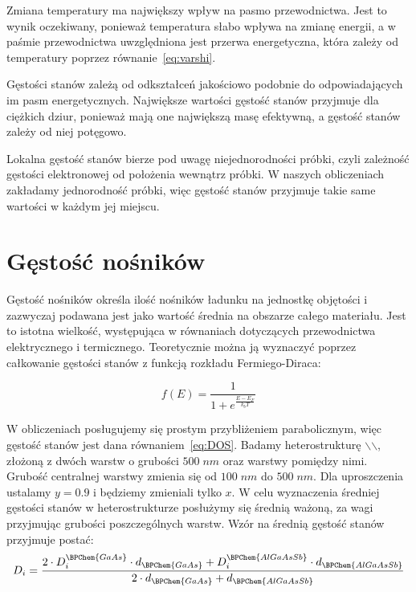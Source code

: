 \documentclass[12pt,openany,a4paper]{book}
\begin{document}
Zmiana temperatury ma największy wpływ na pasmo przewodnictwa. Jest to wynik oczekiwany, ponieważ
temperatura słabo wpływa na zmianę energii, a w paśmie przewodnictwa uwzględniona jest przerwa energetyczna,
która zależy od temperatury poprzez równanie~\eqref{eq:varshi}.

Gęstości stanów zależą od odkształceń jakościowo podobnie do odpowiadających im pasm energetycznych. Największe
wartości gęstość stanów przyjmuje dla ciężkich dziur, ponieważ mają one największą masę efektywną, a gęstość stanów
zależy od niej potęgowo.

Lokalna gęstość stanów bierze pod uwagę niejednorodności próbki, czyli zależność gęstości elektronowej od położenia
wewnątrz próbki. W naszych obliczeniach zakładamy jednorodność próbki, więc gęstość stanów przyjmuje takie same wartości
w każdym jej miejscu.

\newpage


\section{Gęstość nośników}

Gęstość nośników określa ilość nośników ładunku na jednostkę objętości i zazwyczaj podawana jest
jako wartość średnia na obszarze całego materiału. Jest to istotna wielkość, występująca w równaniach
dotyczących przewodnictwa elektrycznego i termicznego. Teoretycznie można ją wyznaczyć poprzez całkowanie
gęstości stanów z funkcją rozkładu Fermiego-Diraca:

\begin{equation}
	f\left(E\right) = \frac{1}{1+e^{\frac{E-E_F}{k_b T}}}
	\label{eq:FD}
\end{equation}

W obliczeniach posługujemy się prostym przybliżeniem
parabolicznym, więc gęstość stanów jest dana równaniem~\eqref{eq:DOS}.
Badamy heterostrukturę \(\backslash\)\(\backslash\),
złożoną z dwóch warstw  o grubości \(500\;nm\) oraz warstwy 
pomiędzy nimi. Grubość centralnej warstwy zmienia się od \(100\;nm\) do \(500\;nm\).
Dla uproszczenia ustalamy \(y = 0.9\) i będziemy zmieniali tylko \(x\).
W celu wyznaczenia średniej gęstości stanów w heterostrukturze posłużymy się średnią ważoną, za wagi przyjmując
grubości poszczególnych warstw. Wzór na średnią gęstość stanów przyjmuje postać:
\begin{equation}
	D_i= \frac{2\cdot D_i^{\BPChem{GaAs}}\cdot d_{\BPChem{GaAs}} +
	 D_i^{\BPChem{AlGaAsSb}} \cdot d_{\BPChem{AlGaAsSb}} }{2\cdot d_{\BPChem{GaAs}}+d_{\BPChem{AlGaAsSb}}}
\end{equation}
\end{document}
